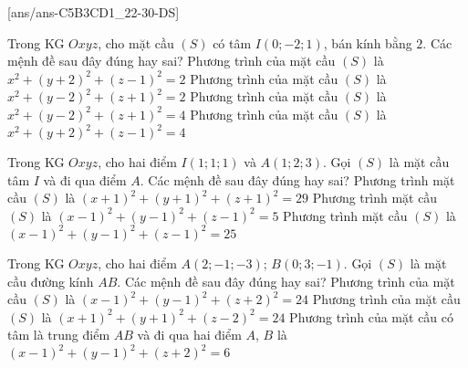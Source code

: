 \TNTF
{}[ans/ans-C5B3CD1_22-30-DS]
\begin{ex}%
	Trong KG $Oxyz$, cho mặt cầu $(S)$ có tâm $I(0;-2;1)$, bán kính bằng $ 2 $. Các mệnh đề sau đây đúng hay sai?
	\choiceTF
	{Phương trình của mặt cầu $(S)$ là $x^2+(y+2)^2+(z-1)^2=2$}
	{Phương trình của mặt cầu $(S)$ là $x^2+(y-2)^2+(z+1)^2=2$}
	{Phương trình của mặt cầu $(S)$ là $x^2+(y-2)^2+(z+1)^2=4$}
	{\True Phương trình của mặt cầu $(S)$ là $x^2+(y+2)^2+(z-1)^2=4$}
\end{ex}
\begin{ex}%
	Trong KG $Oxyz$, cho hai điểm $I(1;1;1)$ và $A(1;2;3)$. Gọi $(S)$ là mặt cầu tâm $ I $ và đi qua điểm $ A $. Các mệnh đề sau đây đúng hay sai?
	{Phương trình mặt cầu $ (S)$ là $(x+1)^{2}+(y+1)^{2}+(z+1)^{2}=29$}
	{\True Phương trình mặt cầu $ (S)$ là $(x-1)^{2}+(y-1)^{2}+(z-1)^{2}=5$}
	{Phương trình mặt cầu $ (S) $ là $(x-1)^2+(y-1)^2+(z-1)^2=25$}
\end{ex}
\begin{ex}%
	Trong KG $Oxyz$, cho hai điểm $A(2;-1;-3)$; $B(0;3;-1)$. Gọi $ (S) $ là mặt cầu đường kính $ AB $. Các mệnh đề sau đây đúng hay sai?
	{Phương trình của mặt cầu $ (S) $ là $(x-1)^2+(y-1)^2+(z+2)^2=24$}
	{Phương trình của mặt cầu $ (S) $ là $(x+1)^2+(y+1)^2+(z-2)^2=24$}
	{\True Phương trình của mặt cầu có tâm là trung điểm $AB$ và đi qua hai điểm $A$, $B$ là $(x-1)^2+(y-1)^2+(z+2)^2=6$}
\end{ex}
